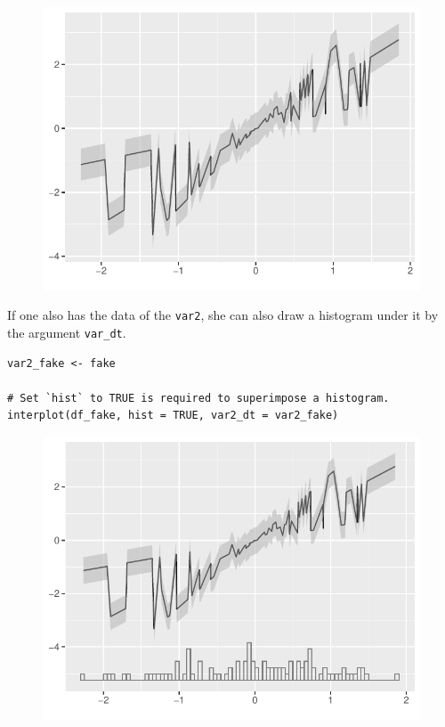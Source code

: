 \documentclass[
  article]{jss}
\begin{document}
\begin{figure}[H]

{\centering \includegraphics{jss_manuscript_files/figure-pdf/unnamed-chunk-19-1.pdf}

}

\end{figure}

If one also has the data of the \texttt{var2}, she can also draw a
histogram under it by the argument \texttt{var\_dt}.

\begin{verbatim}
var2_fake <- fake

# Set `hist` to TRUE is required to superimpose a histogram.
interplot(df_fake, hist = TRUE, var2_dt = var2_fake)
\end{verbatim}

\begin{figure}[H]

{\centering \includegraphics{jss_manuscript_files/figure-pdf/unnamed-chunk-20-1.pdf}

}

\end{figure}
\end{document}
